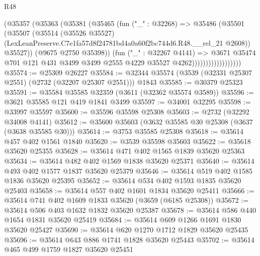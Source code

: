 \begin{lexlean}{R48}
\begin{coremodule}
                              (@35357
                                (@35363
                                  (@35381
                                    (@35465
                                      (fun ("_" : @32268) =>
                                      @35486
                                        (@35501
                                          (@35507
                                            (@35514
                                              (@35526 @35527)
                                              (LexLeanPreserve.C7e1fa57d8f24781bd4a0a60f2bc744d6.R48.__rel_21
                                                @2608))
                                            @35527))
                                        (@9675 @2750 @35398))
                                      (fun ("_" : @32267 @4141) =>
                                      @3671
                                        @35474
                                        @701
                                        @121
                                        @431
                                        @3499
                                        @3499
                                        @2555
                                        @4229
                                        @35527
                                        @4262))))))))))))))))))
@35574 := @25309 @26227
@35584 := @32344 @35574 (@3539 (@32331 @25307 @2551) (@2732 (@32207 @25307 @2551))) @1843
@35585 := @30379 @25323
@35591 := @35584 @35585 @32359 (@3611 (@32362 @35574 @3589))
@35596 := @3621 @35585 @121 @419 @1841 @3499
@35597 := @34001 @32295
@35598 := @33997 @35597
@35600 := @35596 @35598 @25308
@35603 := @2732 (@32292 @34008 @4141)
@35612 := @35600 @35603 (@3632 @35585 @30 @25308 (@3637 (@3638 @35585 @30)))
@35614 := @3753 @35585 @25308
@35618 := @35614 @457 @402 @1561 @1840
@35620 := @3539 @35598 @35603
@35622 := @35618 @35620 @25355
@35628 := @35614 @471 @402 @1565 @1839 @35620 @25363
@35634 := @35614 @482 @402 @1569 @1838 @35620 @25371
@35640 := @35614 @493 @402 @1577 @1837 @35620 @25379
@35646 := @35614 @519 @402 @1585 @1836 @35620 @25395
@35652 := @35614 @534 @402 @1593 @1835 @35620 @25403
@35658 := @35614 @557 @402 @1601 @1834 @35620 @25411
@35666 := @35614 @741 @402 @1609 @1833 @35620 (@3659 (@6185 @25308))
@35672 := @35614 @506 @403 @1632 @1832 @35620 @25387
@35678 := @35614 @586 @440 @1654 @1831 @35620 @25419
@35684 := @35614 @609 @1266 @1691 @1830 @35620 @25427
@35690 := @35614 @620 @1270 @1712 @1829 @35620 @25435
@35696 := @35614 @643 @886 @1741 @1828 @35620 @25443
@35702 := @35614 @465 @499 @1759 @1827 @35620 @25451

\end{coremodule}
\end{lexlean}
